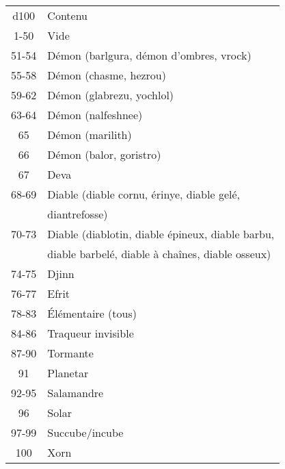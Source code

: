 \begin{center}
\setlength{\tabcolsep}{4pt}
\begin{tabular}{cl}
d100   & Contenu \\
   \rowcolor{LightCyan}
1-50   & Vide \\
51-54  & Démon (barlgura, démon d'ombres, vrock) \\
   \rowcolor{LightCyan}
55-58  & Démon (chasme, hezrou) \\
59-62  & Démon (glabrezu, yochlol) \\
   \rowcolor{LightCyan}
63-64  & Démon (nalfeshnee) \\
65     & Démon (marilith) \\
   \rowcolor{LightCyan}
66     & Démon (balor, goristro) \\
67     & Deva \\
   \rowcolor{LightCyan}
68-69  & Diable (diable cornu, érinye, diable gelé, \\
   \rowcolor{LightCyan}
       & diantrefosse) \\
70-73  & Diable (diablotin, diable épineux, diable barbu, \\
       & diable barbelé, diable à chaînes, diable osseux) \\
   \rowcolor{LightCyan}
74-75  & Djinn \\
76-77  & Efrit \\
   \rowcolor{LightCyan}
78-83  & Élémentaire (tous) \\
84-86  & Traqueur invisible \\
   \rowcolor{LightCyan}
87-90  & Tormante \\
91     & Planetar \\
   \rowcolor{LightCyan}
92-95  & Salamandre \\
96     & Solar \\
   \rowcolor{LightCyan}
97-99  & Succube/incube \\
100    & Xorn \\
\end{tabular}
\end{center}

